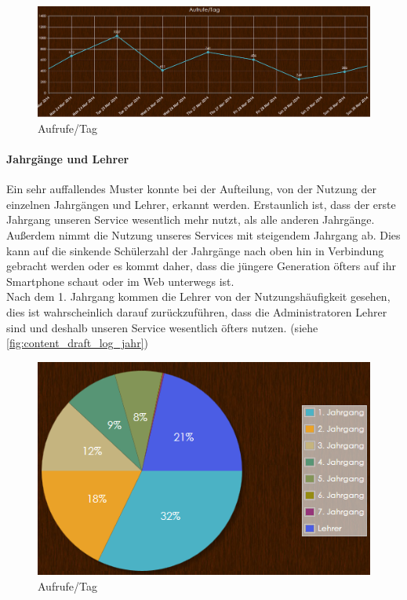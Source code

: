 \begin{figure}[H]
\centering
\includegraphics[keepaspectratio=true, width=17cm]{images/screenshots/statistics/aufruf_tag.png}
\caption{Aufrufe/Tag}
\label{fig:content_draft_log_zugriff_tag}
\end{figure}

\paragraph{Jahrgänge und Lehrer\\}
Ein sehr auffallendes Muster konnte bei der Aufteilung, von der Nutzung der einzelnen Jahrgängen und Lehrer, erkannt werden. Erstaunlich ist, dass der erste Jahrgang unseren Service wesentlich mehr nutzt, als alle anderen Jahrgänge. Außerdem nimmt die Nutzung unseres Services mit steigendem Jahrgang ab. Dies kann auf die sinkende Schülerzahl der Jahrgänge nach oben hin in Verbindung gebracht werden oder es kommt daher, dass die jüngere Generation öfters auf ihr Smartphone schaut oder im Web unterwegs ist.\\
Nach dem 1. Jahrgang kommen die Lehrer von der Nutzungshäufigkeit gesehen, dies ist wahrscheinlich darauf zurückzuführen, dass die Administratoren Lehrer sind und deshalb unseren Service wesentlich öfters nutzen. (siehe \autoref{fig:content_draft_log_jahr})

\begin{figure}[H]
\centering
\includegraphics[keepaspectratio=true, width=12cm]{images/screenshots/statistics/jahrgang.png}
\caption{Aufrufe/Tag}
\label{fig:content_draft_log_jahr}
\end{figure}